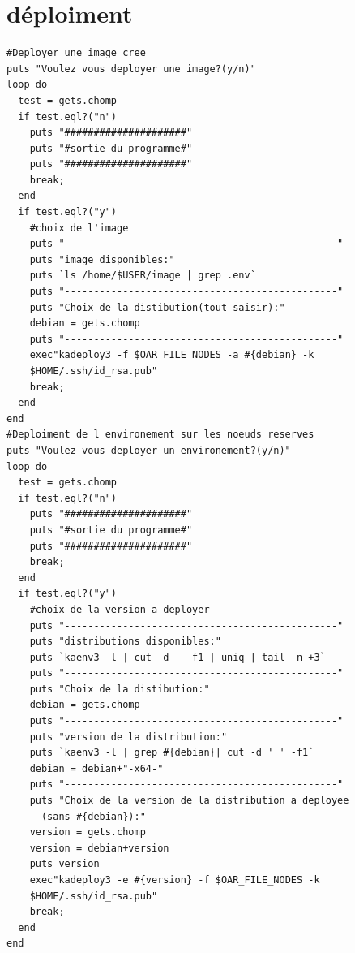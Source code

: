 \documentclass[a4paper,11pt]{report}
\begin{document}
      \section{déploiment}
      \begin{lstlisting}
#Deployer une image cree
puts "Voulez vous deployer une image?(y/n)"
loop do
  test = gets.chomp
  if test.eql?("n")
    puts "#####################"
    puts "#sortie du programme#"
    puts "#####################"
    break;
  end
  if test.eql?("y")
    #choix de l'image                                                                                                                 
    puts "-----------------------------------------------"
    puts "image disponibles:"
    puts `ls /home/$USER/image | grep .env`
    puts "-----------------------------------------------"
    puts "Choix de la distibution(tout saisir):"
    debian = gets.chomp
    puts "-----------------------------------------------"
    exec"kadeploy3 -f $OAR_FILE_NODES -a #{debian} -k 
	$HOME/.ssh/id_rsa.pub"
    break;
  end
end
#Deploiment de l environement sur les noeuds reserves                          
puts "Voulez vous deployer un environement?(y/n)"
loop do
  test = gets.chomp
  if test.eql?("n")
    puts "#####################"
    puts "#sortie du programme#"
    puts "#####################"
    break;
  end
  if test.eql?("y")                                                            
    #choix de la version a deployer                                            
    puts "-----------------------------------------------"
    puts "distributions disponibles:"
    puts `kaenv3 -l | cut -d - -f1 | uniq | tail -n +3`
    puts "-----------------------------------------------"
    puts "Choix de la distibution:"
    debian = gets.chomp
    puts "-----------------------------------------------"
    puts "version de la distribution:"
    puts `kaenv3 -l | grep #{debian}| cut -d ' ' -f1`
    debian = debian+"-x64-"
    puts "-----------------------------------------------"
    puts "Choix de la version de la distribution a deployee 
	  (sans #{debian}):"
    version = gets.chomp
    version = debian+version
    puts version
    exec"kadeploy3 -e #{version} -f $OAR_FILE_NODES -k 
	$HOME/.ssh/id_rsa.pub"
    break;
  end
end
      \end{lstlisting}

      
\end{document}

